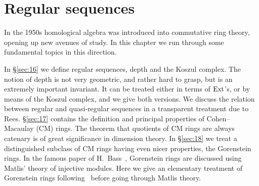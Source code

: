 \chapter{Regular sequences}\label{ch:6}

In the 1950s homological algebra was introduced into commutative ring
theory, opening up new avenues of study. In this chapter we run through
some fundamental topics in this direction.

In \S\ref{sec:16} we define regular sequences, depth and the Koszul complex. The
notion of depth is not very geometric, and rather hard to grasp, but is
an extremely important invariant. It can be treated either in terms of
$\operatorname{Ext}$'s, or by means of the Koszul complex, and we give both versions. We
discuss the relation between regular and quasi-regular sequences in a
transparent treatment due to Rees. \S\ref{sec:17} contains the definition and principal
properties of Cohen--Macaulay (CM) rings. The theorem that quotients of
CM rings are always catenary is of great significance in dimension
theory. In \S\ref{sec:18} we treat a distinguished subclass of CM rings having even
nicer properties, the Gorenstein rings. In the famous paper of H.\ Bass~\cite{Ba1},
Gorenstein rings are discussed using Matlis' theory of injective modules.
Here we give an elementary treatment of Gorenstein rings following~\cite{G6}
before going through Matlis theory.




